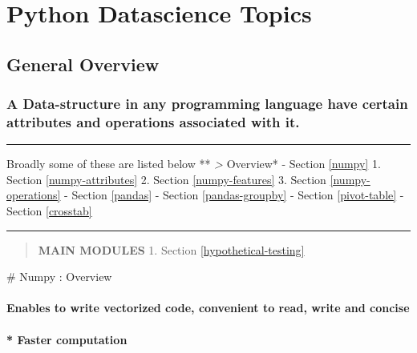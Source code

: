 \documentclass[11pt]{article}
\begin{document}
    \hypertarget{python-datascience-topics}{%
\section{Python Datascience Topics}\label{python-datascience-topics}}

\hypertarget{general-overview}{%
\subsection{General Overview}\label{general-overview}}

\hypertarget{a-data-structure-in-any-programming-language-have-certain-attributes-and-operations-associated-with-it.}{%
\subsubsection{A Data-structure in any programming language have certain
attributes and operations associated with
it.}\label{a-data-structure-in-any-programming-language-have-certain-attributes-and-operations-associated-with-it.}}

\begin{center}\rule{0.5\linewidth}{\linethickness}\end{center}

Broadly some of these are listed below **\emph{ \textgreater{}
}Overview* - Section \ref{numpy} 1. Section \ref{numpy-attributes} 2.
Section \ref{numpy-features} 3. Section \ref{numpy-operations} -
Section \ref{pandas} - Section \ref{pandas-groupby} -
Section \ref{pivot-table} - Section \ref{crosstab}

\begin{center}\rule{0.5\linewidth}{\linethickness}\end{center}

\begin{quote}
\textbf{MAIN MODULES} 1. Section \ref{hypothetical-testing}
\end{quote}

     \# Numpy : Overview

\hypertarget{enables-to-write-vectorized-code-convenient-to-read-write-and-concise}{%
\paragraph{Enables to write vectorized code, convenient to read, write
and
concise}\label{enables-to-write-vectorized-code-convenient-to-read-write-and-concise}}

\hypertarget{faster-computation}{%
\paragraph{* Faster computation}\label{faster-computation}}
\end{document}

